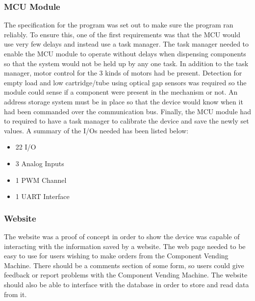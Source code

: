 \documentclass[a4paper,11pt]{article}
\numberwithin{figure}{section}
\numberwithin{table}{section}
\begin{document}
\subsubsection{MCU Module}
\label{subsec:mcuspec}
The specification for the program was set out to make sure the program ran reliably. To ensure this, one of the first requirements was that the MCU would use very few delays and instead use a task manager. The task manager needed to enable the MCU module to operate without delays when dispensing components so that the system would not be held up by any one task. In addition to the task manager, motor control for the 3 kinds of motors had be present. Detection for empty load and low cartridge/tube using optical gap sensors was required so the module could sense if a component were present in the mechanism or not. An address storage system must be in place so that the device would know when it had been commanded over the communication bus. Finally, the MCU module had to required to have a task manager to calibrate the device and save the newly set values. A summary of the I/Os needed has been listed below:
	
	\begin{itemize}
	\setlength\itemsep{0em}
	\item 22 I/O
	\item 3 Analog Inputs
	\item 1 PWM Channel
	\item 1 UART Interface		
	\end{itemize}
	
\subsubsection{Website}
The website was a proof of concept in order to show the device was capable of interacting with the information saved by a website. The web page needed to be easy to use for users wishing to make orders from the Component Vending Machine. There should be a comments section of some form, so users could give feedback or report problems with the Component Vending Machine. The website should also be able to interface with the database in order to store and read data from it.

\newpage
\end{document}
